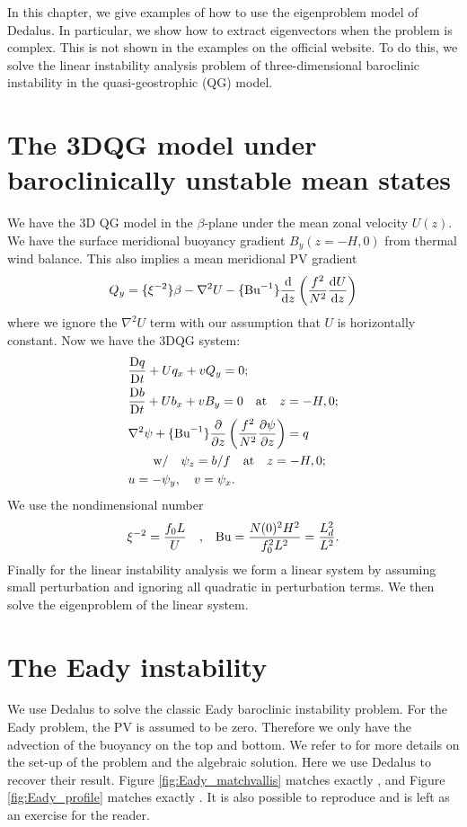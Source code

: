 \graphicspath{{3DQG_Linstab/code/figs/}}

In this chapter, we give examples of how to use the eigenproblem model of Dedalus. In particular, we show how to extract eigenvectors when the problem is complex. This is not shown in the examples on the official website. To do this, we solve the linear instability analysis problem of three-dimensional baroclinic instability in the quasi-geostrophic (QG) model.

\section{The 3DQG model under baroclinically unstable mean states}
We have the 3D QG model in the $\beta$-plane under the mean zonal velocity $U(z)$. We have the surface meridional buoyancy gradient $B_y(z=-H, 0)$ from thermal wind balance. This also implies a mean meridional PV gradient
\begin{align}
    Q_y = \{\xi^{-2}\}\beta-\nabla^2 U-\{\text{Bu}^{-1}\}\frac{\mathrm{d}}{\mathrm{d} z}\left(\frac{f^2}{N^2}\frac{\mathrm{d} U}{\mathrm{d} z}\right)
\end{align}
where we ignore the $\nabla^2 U$ term with our assumption that $U$ is horizontally constant. Now we have the 3DQG system:
\begin{align}
    &\frac{\mathrm{D} q}{\mathrm{D} t}+Uq_x+vQ_y = 0; \\
    &\frac{\mathrm{D} b}{\mathrm{D} t}+Ub_x+vB_y = 0 \quad \mbox{at} \quad z=-H, 0; \\
    &\nabla^2\psi + \{\text{Bu}^{-1}\}\frac{\partial}{\partial z}\left(\frac{f^2}{N^2}\frac{\partial\psi}{\partial z}\right) = q \\
    &\quad\quad \mbox{w/} \quad \psi_z = b/f \quad \mbox{at} \quad z=-H, 0; \\
    &u = -\psi_y, \quad v = \psi_x.
\end{align}
We use the nondimensional number
\begin{align}
    \xi^{-2} = \frac{f_0 L}{U} \quad \mbox{,} \quad \text{Bu} = \frac{N(0)^2H^2}{f_0^2L^2} = \frac{L_{d}^2}{L^2}.
\end{align}
Finally for the linear instability analysis we form a linear system by assuming small perturbation and ignoring all quadratic in perturbation terms. We then solve the eigenproblem of the linear system.

\section{The Eady instability}
We use Dedalus to solve the classic Eady baroclinic instability problem. For the Eady problem, the PV is assumed to be zero. Therefore we only have the advection of the buoyancy on the top and bottom. We refer to \cite[\S 9.5]{Vallis_17} for more details on the set-up of the problem and the algebraic solution. Here we use Dedalus to recover their result. Figure \ref{fig:Eady_matchvallis} matches exactly \cite[Fig. 9.10]{Vallis_17}, and Figure \ref{fig:Eady_profile} matches exactly \cite[Fig. 9.12]{Vallis_17}. It is also possible to reproduce \cite[Fig. 9.11]{Vallis_17} and is left as an exercise for the reader.

